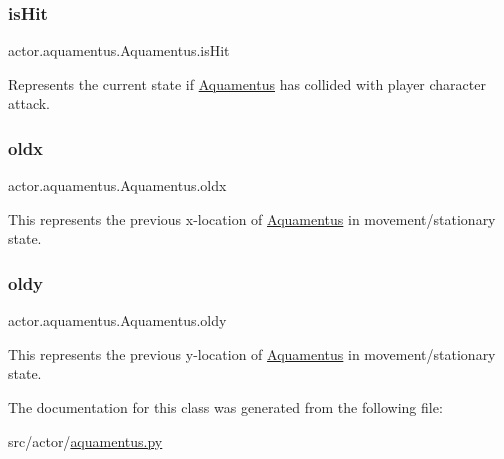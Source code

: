 \mbox{\label{classactor_1_1aquamentus_1_1_aquamentus_a6acef447408a84f5af003f3cf74dec7c}} 
\subsubsection{\texorpdfstring{is\+Hit}{isHit}}
{\footnotesize\ttfamily actor.\+aquamentus.\+Aquamentus.\+is\+Hit}



Represents the current state if \hyperlink{classactor_1_1aquamentus_1_1_aquamentus}{Aquamentus} has collided with player character attack. 

\mbox{\label{classactor_1_1aquamentus_1_1_aquamentus_a462a8a223836cc3b1154ba73cbcd4703}} 
\subsubsection{\texorpdfstring{oldx}{oldx}}
{\footnotesize\ttfamily actor.\+aquamentus.\+Aquamentus.\+oldx}



This represents the previous x-\/location of \hyperlink{classactor_1_1aquamentus_1_1_aquamentus}{Aquamentus} in movement/stationary state. 

\mbox{\label{classactor_1_1aquamentus_1_1_aquamentus_a985f847ed6c6df6d09232a42f8263b8c}} 
\subsubsection{\texorpdfstring{oldy}{oldy}}
{\footnotesize\ttfamily actor.\+aquamentus.\+Aquamentus.\+oldy}



This represents the previous y-\/location of \hyperlink{classactor_1_1aquamentus_1_1_aquamentus}{Aquamentus} in movement/stationary state. 



The documentation for this class was generated from the following file\+:\begin{DoxyCompactItemize}
\item 
src/actor/\hyperlink{aquamentus_8py}{aquamentus.\+py}\end{DoxyCompactItemize}
